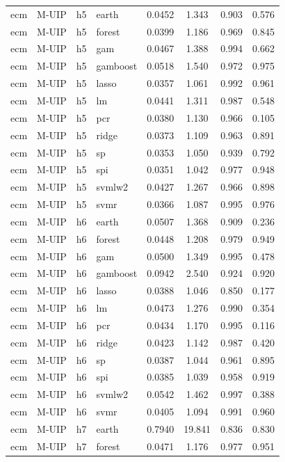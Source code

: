 \begin{ThreePartTable}
\begin{longtable}[t]{llclcccc}
\addlinespace
ecm & M-UIP & h5 & earth & 0.0452 & 1.343 & 0.903 & 0.576\\
ecm & M-UIP & h5 & forest & 0.0399 & 1.186 & 0.969 & 0.845\\
ecm & M-UIP & h5 & gam & 0.0467 & 1.388 & 0.994 & 0.662\\
ecm & M-UIP & h5 & gamboost & 0.0518 & 1.540 & 0.972 & 0.975\\
ecm & M-UIP & h5 & lasso & 0.0357 & 1.061 & 0.992 & 0.961\\
ecm & M-UIP & h5 & lm & 0.0441 & 1.311 & 0.987 & 0.548\\
ecm & M-UIP & h5 & pcr & 0.0380 & 1.130 & 0.966 & 0.105\\
ecm & M-UIP & h5 & ridge & 0.0373 & 1.109 & 0.963 & 0.891\\
ecm & M-UIP & h5 & sp & 0.0353 & 1.050 & 0.939 & 0.792\\
ecm & M-UIP & h5 & spi & 0.0351 & 1.042 & 0.977 & 0.948\\
ecm & M-UIP & h5 & svmlw2 & 0.0427 & 1.267 & 0.966 & 0.898\\
ecm & M-UIP & h5 & svmr & 0.0366 & 1.087 & 0.995 & 0.976\\
\addlinespace
ecm & M-UIP & h6 & earth & 0.0507 & 1.368 & 0.909 & 0.236\\
ecm & M-UIP & h6 & forest & 0.0448 & 1.208 & 0.979 & 0.949\\
ecm & M-UIP & h6 & gam & 0.0500 & 1.349 & 0.995 & 0.478\\
ecm & M-UIP & h6 & gamboost & 0.0942 & 2.540 & 0.924 & 0.920\\
ecm & M-UIP & h6 & lasso & 0.0388 & 1.046 & 0.850 & 0.177\\
ecm & M-UIP & h6 & lm & 0.0473 & 1.276 & 0.990 & 0.354\\
ecm & M-UIP & h6 & pcr & 0.0434 & 1.170 & 0.995 & 0.116\\
ecm & M-UIP & h6 & ridge & 0.0423 & 1.142 & 0.987 & 0.420\\
ecm & M-UIP & h6 & sp & 0.0387 & 1.044 & 0.961 & 0.895\\
ecm & M-UIP & h6 & spi & 0.0385 & 1.039 & 0.958 & 0.919\\
ecm & M-UIP & h6 & svmlw2 & 0.0542 & 1.462 & 0.997 & 0.388\\
ecm & M-UIP & h6 & svmr & 0.0405 & 1.094 & 0.991 & 0.960\\
\addlinespace
ecm & M-UIP & h7 & earth & 0.7940 & 19.841 & 0.836 & 0.830\\
ecm & M-UIP & h7 & forest & 0.0471 & 1.176 & 0.977 & 0.951\\

\end{longtable}
\end{ThreePartTable}
